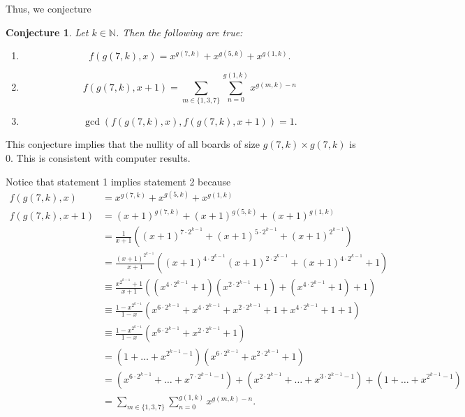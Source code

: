 \documentclass{article}
\newtheorem{conjecture}{Conjecture}
\newcommand{\N}{\mathbb{N}}
\begin{document}
	Thus, we conjecture
	\begin{conjecture}
		Let $k \in \N$.
		Then the following are true:
		\begin{enumerate}
			\item
			\begin{equation*}
				f(g(7,k),x) = x^{g(7,k)} + x^{g(5,k)} + x^{g(1,k)}.
			\end{equation*}
			\item
			\begin{equation*}
				f(g(7,k),x+1) = \sum_{m\in\{1,3,7\}}{\sum_{n=0}^{g(1,k)}{x^{g(m,k)-n}}}
			\end{equation*}
			\item
			\begin{equation*}
				\gcd\left(f(g(7,k),x),f(g(7,k),x+1)\right) = 1.
			\end{equation*}
		\end{enumerate}
	\end{conjecture}
	This conjecture implies that the nullity of all boards of size $g(7,k) \times g(7,k)$ is 0.
	This is consistent with computer results.
	
	Notice that statement 1 implies statement 2 because
	\begin{align*}
		f(g(7,k),x) &= x^{g(7,k)} + x^{g(5,k)} + x^{g(1,k)} \\
		f(g(7,k),x+1) &= (x+1)^{g(7,k)} + (x+1)^{g(5,k)} + (x+1)^{g(1,k)} \\
		&= \frac{1}{x+1} \left((x+1)^{7\cdot2^{k-1}} + (x+1)^{5\cdot2^{k-1}} + (x+1)^{2^{k-1}}\right) \\
		&= \frac{(x+1)^{2^{k-1}}}{x+1}\left((x+1)^{4\cdot2^{k-1}}(x+1)^{2\cdot2^{k-1}}+(x+1)^{4\cdot2^{k-1}}+1\right) \\
		&\equiv \frac{x^{2^{k-1}}+1}{x+1}\left(\left(x^{4\cdot2^{k-1}}+1\right)\left(x^{2\cdot2^{k-1}}+1\right)+\left(x^{4\cdot2^{k-1}}+1\right)+1\right) \\
		&\equiv \frac{1-x^{2^{k-1}}}{1-x}\left(x^{6\cdot2^{k-1}}+x^{4\cdot2^{k-1}}+x^{2\cdot2^{k-1}}+1+x^{4\cdot2^{k-1}}+1+1\right) \\
		&\equiv \frac{1-x^{2^{k-1}}}{1-x}\left(x^{6\cdot2^{k-1}}+x^{2\cdot2^{k-1}}+1\right) \\
		&= \left(1+\dots+x^{2^{k-1}-1}\right)\left(x^{6\cdot2^{k-1}}+x^{2\cdot2^{k-1}}+1\right) \\
		&= \left(x^{6\cdot2^{k-1}}+\dots+x^{7\cdot2^{k-1}-1}\right) + \left(x^{2\cdot2^{k-1}}+\dots+x^{3\cdot2^{k-1}-1}\right) + \left(1+\dots+x^{2^{k-1}-1}\right) \\
		&= \sum_{m\in\{1,3,7\}}{\sum_{n=0}^{g(1,k)}{x^{g(m,k)-n}}}.
	\end{align*}
	
\end{document}
